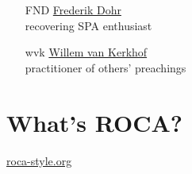 \documentclass{beamer}
\begin{document}
\begin{frame}{\insertsectionhead}
  \begin{itemize}
    \item[FND] \href{mailto:fnd@innoq.com}{Frederik Dohr} \\
        recovering SPA enthusiast
    \item[]
    \item[wvk] \href{mailto:wvk@innoq.com}{Willem van Kerkhof} \\
        practitioner of others' preachings
  \end{itemize}


\end{frame}

\section{What's ROCA?}

{
  \begin{frame}
    \vspace*{-6.4cm}
    \href{http://roca-style.org}{roca-style.org}

  \end{frame}
}
\end{document}
